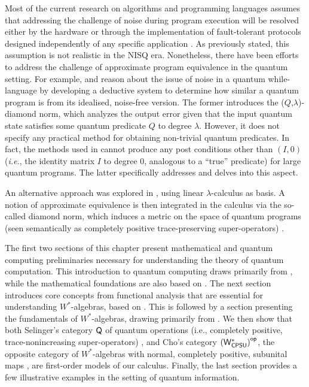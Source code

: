 Most of the current research on algorithms and programming languages assumes that addressing the challenge of noise during program execution will be resolved either by the hardware or through the implementation of fault-tolerant protocols designed independently of any specific application \cite{chong2017programming}. As previously stated, this assumption is not realistic in the NISQ era. Nonetheless, there have been efforts to address the challenge of approximate program equivalence in the quantum setting. For example, \cite{hung2019quantitative} and \cite{tao2021gleipnir} reason about the issue of noise in a quantum while-language by developing a deductive system to determine how similar a quantum program is from its idealised, noise-free version. The former introduces the ($Q$,$\lambda$)-diamond norm, which analyzes the output error given that the input quantum state satisfies some quantum predicate $Q$ to degree $\lambda$. However, it does not specify any practical method for obtaining non-trivial quantum predicates. In fact, the methods used in \cite{hung2019quantitative} cannot produce any post conditions other than $(I,0)$ (\textit{i.e.}, the identity matrix $I$ to degree 0, analogous to a ``true” predicate) for large quantum programs. The latter specifically addresses and delves into this aspect.  

An alternative approach was explored in \cite{dahlqvist2023syntactic}, using linear $\lambda$-calculus as basis. A notion of approximate equivalence is then
integrated in the calculus via the so-called diamond norm, which induces a metric on the space of quantum programs (seen semantically as completely positive trace-preserving super-operators) \cite{watrous2018theory}. 


\vspace{20pt}

The first two sections of this chapter present  mathematical and quantum computing preliminaries necessary for understanding the theory of quantum computation. This introduction to quantum computing draws primarily from \cite{nielsen2010quantum,watrous2018theory}, while the mathematical foundations are also based on \cite{heinosaariMathematicalLanguageQuantum2011,conwayCourseFunctionalAnalysis2007,conwayCourseOperatorTheory2000}.
The next section introduces core concepts from functional analysis that are essential for understanding \( W^* \)-algebras, based on \cite{rudin91functional,guide2006infinite}. This is followed by a section presenting the fundamentals of \( W^* \)-algebras, drawing primarily from \cite{sakaiCAlgebrasWAlgebras1998,takesakiTheoryOperatorAlgebras1979,westerbaanCategoryNeumannAlgebras2019}.
We then show that both Selinger’s category 
$\mathsf{Q}$ of quantum operations (i.e., completely positive, trace-nonincreasing super-operators) \cite{selinger2004towards}, and Cho’s category 
$\left(\mathsf{W^*_{CPSU}}\right)^{\mathsf{op}}$, the opposite category of \( W^* \)-algebras with normal, completely positive, subunital maps \cite{choSemanticsQuantumProgramming2016}, are first-order models of our calculus.
Finally, the last section provides a few illustrative examples in the setting of quantum information.







